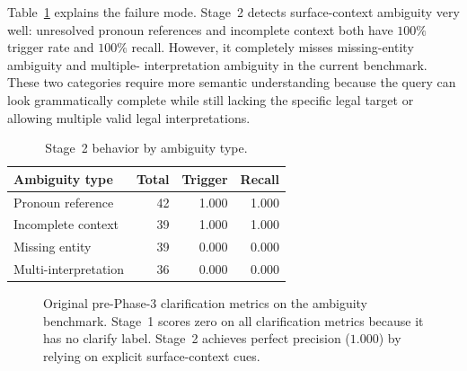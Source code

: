 \documentclass[11pt,twocolumn]{article}
\begin{document}
Table~\ref{tab:ambiguity_type_results} explains the failure
mode. Stage~2 detects surface-context ambiguity very well:
unresolved pronoun references and incomplete context both
have $100\%$ trigger rate and $100\%$ recall. However, it
completely misses missing-entity ambiguity and multiple-
interpretation ambiguity in the current benchmark. These two
categories require more semantic understanding because the
query can look grammatically complete while still lacking the
specific legal target or allowing multiple valid legal
interpretations.

\begin{table}[!htbp]
\centering
\caption{Stage~2 behavior by ambiguity type.}
\label{tab:ambiguity_type_results}
\small
\setlength{\tabcolsep}{3.0pt}
\begin{tabular}{lrrr}
\toprule
\textbf{Ambiguity type} & \textbf{Total} & \textbf{Trigger} & \textbf{Recall} \\
\midrule
Pronoun reference & 42 & 1.000 & 1.000 \\
Incomplete context & 39 & 1.000 & 1.000 \\
Missing entity & 39 & 0.000 & 0.000 \\
Multi-interpretation & 36 & 0.000 & 0.000 \\
\bottomrule
\end{tabular}
\end{table}

\begin{figure}[!htbp]
\centering
{}
\caption{Original pre-Phase-3 clarification metrics on the ambiguity benchmark.
Stage~1 scores zero on all clarification metrics because it has
no clarify label. Stage~2 achieves perfect precision ($1.000$)
by relying on explicit surface-context cues.}
\label{fig:clarify_f1_bar}
\end{figure}
\end{document}
